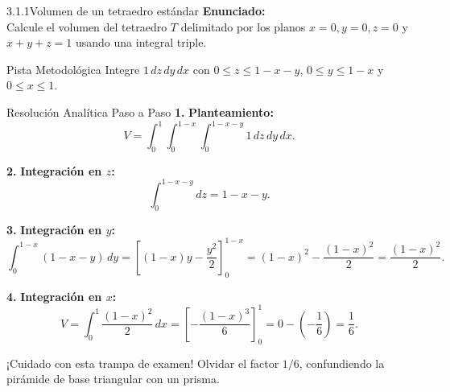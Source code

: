 \documentclass[11pt,a4paper]{article}
\begin{document}
\begin{nivelbox}{3.1.1}{Volumen de un tetraedro estándar}
\textbf{Enunciado:}\\
Calcule el volumen del tetraedro $T$ delimitado por los planos $x=0, y=0, z=0$ y $x + y + z = 1$ usando una integral triple.

\begin{observacionbox}{Pista Metodológica}
Integre $1 \, dz \, dy \, dx$ con $0 \le z \le 1 - x - y$, $0 \le y \le 1 - x$ y $0 \le x \le 1$.
\end{observacionbox}

\begin{ejerciciobox}{Resolución Analítica Paso a Paso}
\smallskip\noindent\textbf{1.} \textbf{Planteamiento:}
\[V = \int_0^1 \int_0^{1-x} \int_0^{1-x-y} 1 \, dz \, dy \, dx.\]

\smallskip\noindent\textbf{2.} \textbf{Integración en $z$:}
\[\int_0^{1-x-y} dz = 1 - x - y.\]

\smallskip\noindent\textbf{3.} \textbf{Integración en $y$:}
\[\int_0^{1-x} (1 - x - y) \, dy = \left[ (1 - x)y - \frac{y^2}{2} \right]_0^{1-x} = (1 - x)^2 - \frac{(1-x)^2}{2} = \frac{(1-x)^2}{2}.\]

\smallskip\noindent\textbf{4.} \textbf{Integración en $x$:}
\[V = \int_0^1 \frac{(1-x)^2}{2} \, dx = \left[ -\frac{(1-x)^3}{6} \right]_0^1 = 0 - \left(-\frac{1}{6}\right) = \frac{1}{6}.\]
\end{ejerciciobox}

\begin{errorbox}{¡Cuidado con esta trampa de examen!}
Olvidar el factor $1/6$, confundiendo la pirámide de base triangular con un prisma.
\end{errorbox}
\end{nivelbox}
\bigskip
\end{document}
